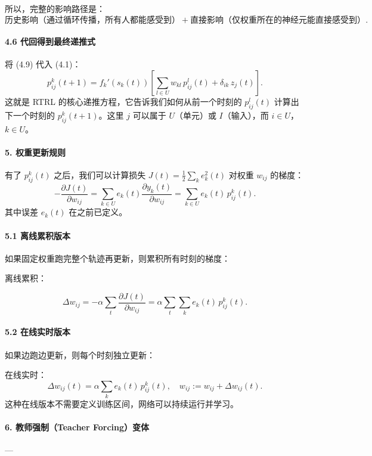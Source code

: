 \documentclass[journal,12pt,onecolumn]{IEEEtran}
\begin{document}
所以，完整的影响路径是：
\[
\boxed{\text{历史影响（通过循环传播，所有人都能感受到）} + \text{直接影响（仅权重所在的神经元能直接感受到）}.}
\]

\paragraph{4.6 代回得到最终递推式}

将 (4.9) 代入 (4.1)：
\[
\boxed{
p_{ij}^k(t+1) = f_k'(s_k(t)) \left[ \sum_{l \in U} w_{kl} \, p_{ij}^l(t) + \delta_{ik} \, z_j(t) \right].
} \tag{4.10}
\]
这就是 RTRL 的核心递推方程，它告诉我们如何从前一个时刻的 \(p_{ij}^l(t)\) 计算出下一个时刻的 \(p_{ij}^k(t+1)\)。这里 \(j\) 可以属于 \(U\)（单元）或 \(I\)（输入），而 \(i \in U\)，\(k \in U\)。

\paragraph{5. 权重更新规则}

有了 \(p_{ij}^k(t)\) 之后，我们可以计算损失 \(J(t) = \frac{1}{2}\sum_k e_k^2(t)\) 对权重 \(w_{ij}\) 的梯度：
\[
-\frac{\partial J(t)}{\partial w_{ij}} = \sum_{k \in U} e_k(t) \frac{\partial y_k(t)}{\partial w_{ij}} = \sum_{k \in U} e_k(t) \, p_{ij}^k(t). \tag{5.1}
\]
其中误差 \(e_k(t)\) 在之前已定义。

\paragraph{5.1 离线累积版本}
如果固定权重跑完整个轨迹再更新，则累积所有时刻的梯度：

离线累积：

\[
\Delta w_{ij} = -\alpha \sum_{t} \frac{\partial J(t)}{\partial w_{ij}} = \alpha \sum_{t} \sum_{k} e_k(t) \, p_{ij}^k(t). \tag{5.2}
\]

\paragraph{5.2 在线实时版本}
如果边跑边更新，则每个时刻独立更新：

在线实时：
\[
\Delta w_{ij}(t) = \alpha \sum_{k} e_k(t) \, p_{ij}^k(t), \quad w_{ij} := w_{ij} + \Delta w_{ij}(t). \tag{5.3}
\]
这种在线版本不需要定义训练区间，网络可以持续运行并学习。

\paragraph{6. 教师强制（Teacher Forcing）变体}
---
\end{document}
